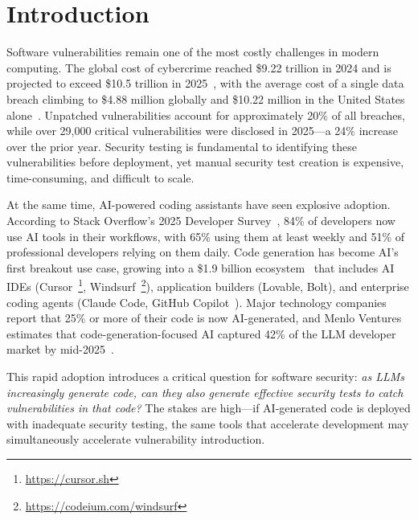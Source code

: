 \documentclass[sigconf,review,anonymous]{acmart}
\begin{document}

\maketitle

\section{Introduction}

Software vulnerabilities remain one of the most costly challenges in modern computing. The global cost of cybercrime reached \$9.22 trillion in 2024 and is projected to exceed \$10.5 trillion in 2025~\cite{cybersecventures2025}, with the average cost of a single data breach climbing to \$4.88 million globally and \$10.22 million in the United States alone~\cite{ibm2024breach}. Unpatched vulnerabilities account for approximately 20\% of all breaches, while over 29,000 critical vulnerabilities were disclosed in 2025---a 24\% increase over the prior year. Security testing is fundamental to identifying these vulnerabilities before deployment, yet manual security test creation is expensive, time-consuming, and difficult to scale.

At the same time, AI-powered coding assistants have seen explosive adoption. According to Stack Overflow's 2025 Developer Survey~\cite{stackoverflow2025survey}, 84\% of developers now use AI tools in their workflows, with 65\% using them at least weekly and 51\% of professional developers relying on them daily. Code generation has become AI's first breakout use case, growing into a \$1.9 billion ecosystem~\cite{menlo2025llm} that includes AI IDEs (Cursor~\footnote{\url{https://cursor.sh}}, Windsurf~\footnote{\url{https://codeium.com/windsurf}}), application builders (Lovable, Bolt), and enterprise coding agents (Claude Code, GitHub Copilot~\cite{pearce2022asleep}). Major technology companies report that 25\% or more of their code is now AI-generated, and Menlo Ventures estimates that code-generation-focused AI captured 42\% of the LLM developer market by mid-2025~\cite{menlo2025llm}.

This rapid adoption introduces a critical question for software security: \emph{as LLMs increasingly generate code, can they also generate effective security tests to catch vulnerabilities in that code?} The stakes are high---if AI-generated code is deployed with inadequate security testing, the same tools that accelerate development may simultaneously accelerate vulnerability introduction.
\end{document}
